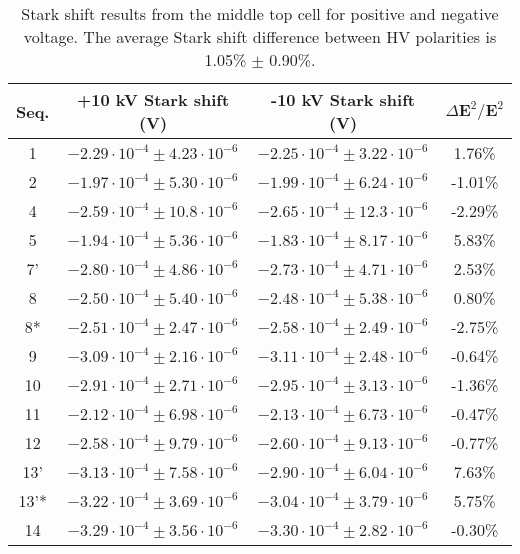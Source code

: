 \documentclass [10pt, twoside] {uwthesis}[2012/04/02]
\begin{document}
\begin{table} 
\footnotesize													
\begin{center}
\caption[Top cell quadratic Stark shift results] 
{\narrower Stark shift results from the middle top cell for positive and negative voltage. The average Stark shift difference between HV polarities is 1.05\% $\pm$ 0.90\%.}   
\label{Stark_MT}
\begin{tabular}{cccc}
\hline \hline									
Seq. & +10 kV Stark shift (V) & -10 kV Stark shift (V) & $\Delta \mathbf{E}^2/\mathbf{E}^2$ \\
\hline        	
1   & $-2.29 \cdot 10^{-4} \pm 4.23 \cdot 10^{-6}$ & $-2.25 \cdot 10^{-4} \pm 3.22 \cdot 10^{-6}$ & 1.76\%  \\
2   & $-1.97 \cdot 10^{-4} \pm 5.30 \cdot 10^{-6}$ & $-1.99 \cdot 10^{-4} \pm 6.24 \cdot 10^{-6}$ & -1.01\% \\
4   & $-2.59 \cdot 10^{-4} \pm 10.8 \cdot 10^{-6}$ & $-2.65 \cdot 10^{-4} \pm 12.3 \cdot 10^{-6}$ & -2.29\% \\
5   & $-1.94 \cdot 10^{-4} \pm 5.36 \cdot 10^{-6}$ & $-1.83 \cdot 10^{-4} \pm 8.17 \cdot 10^{-6}$ & 5.83\%  \\
7'  & $-2.80 \cdot 10^{-4} \pm 4.86 \cdot 10^{-6}$ & $-2.73 \cdot 10^{-4} \pm 4.71 \cdot 10^{-6}$ & 2.53\%  \\
8   & $-2.50 \cdot 10^{-4} \pm 5.40 \cdot 10^{-6}$ & $-2.48 \cdot 10^{-4} \pm 5.38 \cdot 10^{-6}$ & 0.80\%  \\
8*  & $-2.51 \cdot 10^{-4} \pm 2.47 \cdot 10^{-6}$ & $-2.58 \cdot 10^{-4} \pm 2.49 \cdot 10^{-6}$ & -2.75\% \\
9   & $-3.09 \cdot 10^{-4} \pm 2.16 \cdot 10^{-6}$ & $-3.11 \cdot 10^{-4} \pm 2.48 \cdot 10^{-6}$ & -0.64\% \\
10  & $-2.91 \cdot 10^{-4} \pm 2.71 \cdot 10^{-6}$ & $-2.95 \cdot 10^{-4} \pm 3.13 \cdot 10^{-6}$ & -1.36\% \\
11  & $-2.12 \cdot 10^{-4} \pm 6.98 \cdot 10^{-6}$ & $-2.13 \cdot 10^{-4} \pm 6.73 \cdot 10^{-6}$ & -0.47\% \\
12  & $-2.58 \cdot 10^{-4} \pm 9.79 \cdot 10^{-6}$ & $-2.60 \cdot 10^{-4} \pm 9.13 \cdot 10^{-6}$ & -0.77\% \\
13' & $-3.13 \cdot 10^{-4} \pm 7.58 \cdot 10^{-6}$ & $-2.90 \cdot 10^{-4} \pm 6.04 \cdot 10^{-6}$ & 7.63\%  \\
13'*& $-3.22 \cdot 10^{-4} \pm 3.69 \cdot 10^{-6}$ & $-3.04 \cdot 10^{-4} \pm 3.79 \cdot 10^{-6}$ & 5.75\%  \\
14  & $-3.29 \cdot 10^{-4} \pm 3.56 \cdot 10^{-6}$ & $-3.30 \cdot 10^{-4} \pm 2.82 \cdot 10^{-6}$ & -0.30\% \\
\hline
\end{tabular}			
\end{center}										
\end{table}
\end{document}
